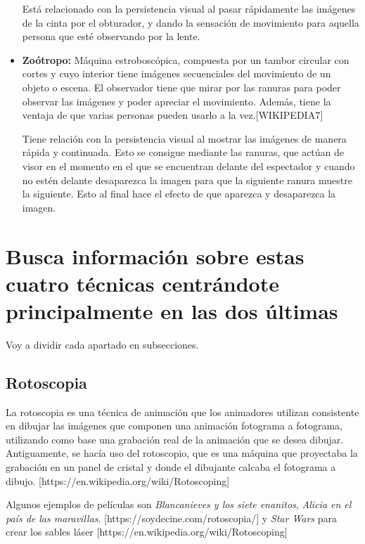 \documentclass{article}
\begin{document}
\begin{itemize}
    Está relacionado con la persistencia visual al pasar rápidamente las imágenes de la cinta por el obturador, y dando la sensación de movimiento para aquella persona que esté observando por la lente.

    \item \textbf{Zoótropo: }Máquina estroboscópica, compuesta por un tambor circular con cortes y cuyo interior tiene imágenes secuenciales del movimiento de un objeto o escena. El observador tiene que mirar por las ranuras para poder observar las imágenes y poder apreciar el movimiento. Además, tiene la ventaja de que varias personas pueden usarlo a la vez.[WIKIPEDIA7]
    
    Tiene relación con la persistencia visual al mostrar las imágenes de manera rápida y continuada. Esto se consigue mediante las ranuras, que actúan de visor en el momento en el que se encuentran delante del espectador y cuando no estén delante desaparezca la imagen para que la siguiente ranura muestre la siguiente. Esto al final hace el efecto de que aparezca y desaparezca la imagen.
\end{itemize}


\section{Busca información sobre estas cuatro técnicas centrándote principalmente en las dos últimas}

Voy a dividir cada apartado en subsecciones.

\subsection{Rotoscopia}

La rotoscopia es una técnica de animación que los animadores utilizan consistente en dibujar las imágenes que componen una animación fotograma a fotograma, utilizando como base una grabación real de la animación que se desea dibujar. Antiguamente, se hacía uso del rotoscopio, que es una máquina que proyectaba la grabación en un panel de cristal y donde el dibujante calcaba el fotograma a dibujo. [https://en.wikipedia.org/wiki/Rotoscoping]

\bigskip

Algunos ejemplos de películas son \textit{Blancanieves y los siete enanitos}, \textit{Alicia en el país de las maravillas}. [https://soydecine.com/rotoscopia/] y \textit{Star Wars} para crear los sables láser [https://en.wikipedia.org/wiki/Rotoscoping]
\end{document}
